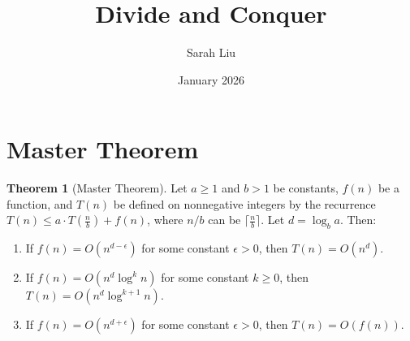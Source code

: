 \documentclass{article}
\title{Divide and Conquer}
\author{Sarah Liu}
\date{January 2026}
\theoremstyle{definition}
\newtheorem{theorem}{Theorem}[section]
\theoremstyle{remark}
\begin{document}
\maketitle

\section{Master Theorem}
\begin{theorem}[Master Theorem]
    Let $a\geq 1$ and $b>1$ be constants, $f(n)$ be a function, and $T(n)$ be defined on nonnegative integers by the recurrence $T(n)\leq a\cdot T(\frac{n}{b})+f(n)$, where $n/b$ can be $\lceil \frac{n}{b}\rceil$. Let $d=\log_b a$. Then:
    \begin{enumerate}
        \item If $f(n)=O(n^{d-\epsilon})$ for some constant $\epsilon>0$, then $T(n)=O(n^d)$.
        \item If $f(n)=O(n^{d}\log^k n)$ for some constant $k\geq0$, then $T(n)=O(n^{d}\log^{k+1} n)$.
        \item If $f(n)=O(n^{d+\epsilon})$ for some constant $\epsilon>0$, then $T(n)=O(f(n))$.
    \end{enumerate}
\end{theorem}
\end{document}
